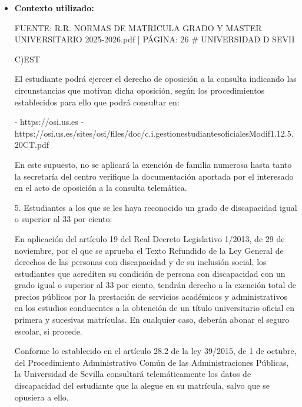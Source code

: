 \documentclass{article}
\begin{document}
\begin{itemize}
\begin{itemize}
                En resumen, los estudiantes con discapacidad que tienen un grado de discapacidad igual o superior al 33 por 100 tienen derecho a la gratuidad del precio público completo por matrícula, excepto el seguro escolar, si procede, y deberán acreditar su condición de discapacidad según los procedimientos establecidos por la Universidad de Sevilla.
          \item \textbf{Contexto utilizado:}
                \begin{scriptsize}
                  FUENTE: R.R. NORMAS DE MATRICULA GRADO Y MASTER UNIVERSITARIO 2025-2026.pdf | PÁGINA: 26
                  \# UNIVERSIDAD D SEVII

                  C)EST

                  El estudiante podrá ejercer el derecho de oposición a la consulta indicando las circunstancias que motivan dicha oposición, según los procedimientos establecidos para ello que podrá consultar en:

                  - https://osi.us.es
                  - https://osi.us.es/sites/osi/files/doc/c.i.gestionestudiantesoficialesModif1.12.5.20CT.pdf

                  En este supuesto, no se aplicará la exención de familia numerosa hasta tanto la secretaría del centro verifique la documentación aportada por el interesado en el acto de oposición a la consulta telemática.

                  5. Estudiantes a los que se les haya reconocido un grado de discapacidad igual o superior al 33 por ciento:

                  En aplicación del artículo 19 del Real Decreto Legislativo 1/2013, de 29 de noviembre, por el que se aprueba el Texto Refundido de la Ley General de derechos de las personas con discapacidad y de su inclusión social, los estudiantes que acrediten su condición de persona con discapacidad con un grado igual o superior al 33 por ciento, tendrán derecho a la exención total de precios públicos por la prestación de servicios académicos y administrativos en los estudios conducentes a la obtención de un título universitario oficial en primera y sucesivas matrículas. En cualquier caso, deberán abonar el seguro escolar, si procede.

                  Conforme lo establecido en el artículo 28.2 de la ley 39/2015, de 1 de octubre, del Procedimiento Administrativo Común de las Administraciones Públicas, la Universidad de Sevilla consultará telemáticamente los datos de discapacidad del estudiante que la alegue en su matrícula, salvo que se opusiera a ello.


\end{scriptsize}
\end{itemize}
\end{itemize}
\end{document}
